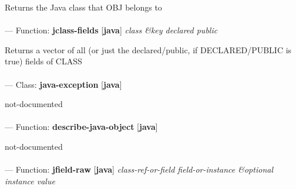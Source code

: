 \begin{adjustwidth}{5em}{5em}
Returns the Java class that OBJ belongs to
\end{adjustwidth}

\paragraph{}
\label{JAVA:JCLASS-FIELDS}
--- Function: \textbf{jclass-fields} [\textbf{java}] \textit{class \&key declared public}

\begin{adjustwidth}{5em}{5em}
Returns a vector of all (or just the declared/public, if DECLARED/PUBLIC is true) fields of CLASS
\end{adjustwidth}

\paragraph{}
\label{JAVA:JAVA-EXCEPTION}
--- Class: \textbf{java-exception} [\textbf{java}] \textit{}

\begin{adjustwidth}{5em}{5em}
not-documented
\end{adjustwidth}

\paragraph{}
\label{JAVA:DESCRIBE-JAVA-OBJECT}
--- Function: \textbf{describe-java-object} [\textbf{java}] \textit{}

\begin{adjustwidth}{5em}{5em}
not-documented
\end{adjustwidth}

\paragraph{}
\label{JAVA:JFIELD-RAW}
--- Function: \textbf{jfield-raw} [\textbf{java}] \textit{class-ref-or-field field-or-instance \&optional instance value}

